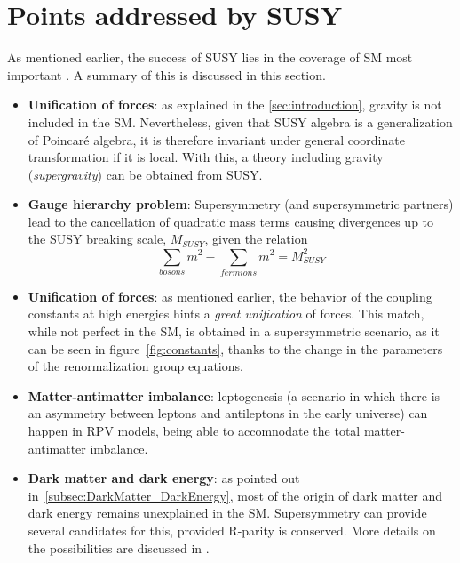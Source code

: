\section{Points addressed by SUSY}
\label{sec:SUSYpoints}
As mentioned earlier, the success of SUSY lies in the coverage of SM most important . A summary of this is discussed in this section. 
\begin{itemize}
\item \textbf{Unification of forces}: as explained in the \ref{sec:introduction}, gravity is not included in the SM. Nevertheless, given that SUSY algebra is a generalization of Poincaré algebra, it is therefore invariant under general coordinate transformation if it is local. With this, a theory including gravity ({\textit{supergravity}}) can be obtained from SUSY. 
\item \textbf{Gauge hierarchy problem}: Supersymmetry (and supersymmetric partners) lead to the cancellation of quadratic mass terms causing divergences up to the SUSY breaking scale, $M_{SUSY}$, given the relation 
\begin{equation}
\sum_{bosons} m^2 - \sum_{fermions} m^2 = M_{SUSY}^2
\end{equation}
\item \textbf{Unification of forces}: as mentioned earlier, the behavior of the coupling constants at high energies hints a \textit{great unification} of forces. This match, while not perfect in the SM, is obtained in a supersymmetric scenario, as it can be seen in figure~\ref{fig:constants}, thanks to the change in the parameters of the renormalization group equations. 
\item \textbf{Matter-antimatter imbalance}: leptogenesis (a scenario in which there is an asymmetry between leptons and antileptons in the early universe) can happen in RPV models, being able to accomnodate the total matter-antimatter imbalance. %
\item \textbf{Dark matter and dark energy}: as pointed out in~\ref{subsec:DarkMatter_DarkEnergy}, most of the origin of dark matter and dark energy remains unexplained in the SM. Supersymmetry can provide several candidates for this, provided R-parity is conserved. More details on the possibilities are discussed in .
\end{itemize}

